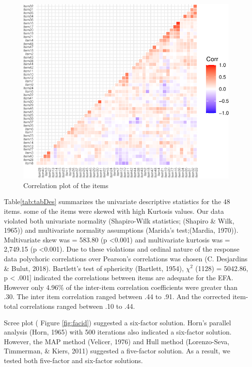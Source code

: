 \documentclass[
  english,
  man]{apa6}
\begin{document}
\begin{figure}

{\centering \includegraphics[width=0.5\linewidth]{manuscript_files/figure-latex/figCor-1} 

}

\caption{Correlation plot of the items}\label{fig:figCor}
\end{figure}

Table\ref{tab:tabDes} summarizes the univariate descriptive statistics for the 48 items. some of the items were skewed with high Kurtosis values. Our data violated both univariate normality (Shapiro-Wilk statistics; (Shapiro \& Wilk, 1965)) and multivariate normality assumptions (Marida's test;(Mardia, 1970)). Multivariate skew was = 583.80 (p \textless0.001) and multivariate kurtosis was = 2,749.15 (p \textless0.001). Due to these violations and ordinal nature of the response data polychoric correlations over Pearson's correlations was chosen (C. Desjardins \& Bulut, 2018). Bartlett's test of sphericity (Bartlett, 1954), \(\chi^2\) (1128) = 5042.86, p \textless{} .001{]} indicated the correlations between items are adequate for the EFA. However only 4.96\% of the inter-item correlation coefficients were greater than .30. The inter item correlation ranged between .44 to .91. And the corrected item-total correlations ranged between .10 to .44.

Scree plot ( Figure \ref{fig:facid}) suggested a six-factor solution. Horn's parallel analysis (Horn, 1965) with 500 iterations also indicated a six-factor solution. However, the MAP method (Velicer, 1976) and Hull method (Lorenzo-Seva, Timmerman, \& Kiers, 2011) suggested a five-factor solution. As a result, we tested both five-factor and six-factor solutions.
\end{document}
